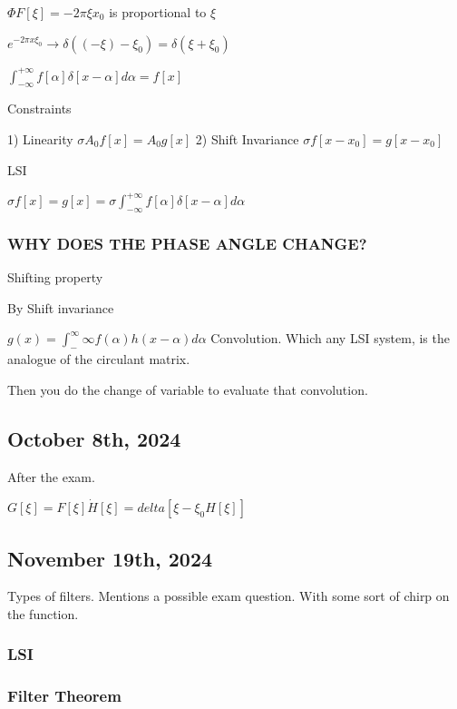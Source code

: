 \documentclass{article}
\begin{document}
$\Phi{F[\xi]}= -2 \pi \xi x_{0}$ is proportional to $\xi$


$e^{- 2 \pi x \xi_{0}} \rightarrow \delta((-\xi)-\xi_{0}) = \delta(\xi +\xi_{0})$


$\int_{-\infty}^{+ \infty} f[\alpha] \delta[x- \alpha] d \alpha = f[x]$

Constraints 

1) Linearity $\sigma{A_{0}f[x]}= A_0 g[x]$
2) Shift Invariance $\sigma {f[x- x_{0}]} = g[x-x_{0}]$

LSI 

$\sigma {f[x]}= g[x]= \sigma {\int_{- \infty}^{+ \infty}f[\alpha]\delta[x- \alpha]d \alpha}$




\subsubsection{WHY DOES THE PHASE ANGLE CHANGE?} 

Shifting property 

By Shift invariance 

$g(x) = \int ^{\infty}_-{\infty}f(\alpha) h(x- \alpha) d \alpha$ Convolution. 
Which any LSI system, is the analogue of the circulant matrix. 

Then you do the change of variable to evaluate that convolution. 


\subsection{October 8th, 2024}

After the exam. 

$G[\xi] = F[\xi] \dot H[\xi] = delta[\xi - \xi_{0}H[\xi]]$



\subsection{November 19th, 2024}
Types of filters. 
Mentions a possible exam question. With some sort of chirp on the function.  



\subsubsection{LSI}


\subsubsection{Filter Theorem}
\end{document}

